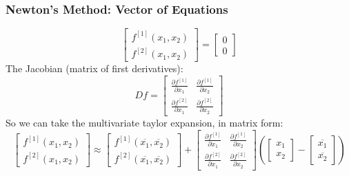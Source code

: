 \documentclass{beamer}
\begin{document}
\begin{frame}
\frametitle[alignment=center]{Newton's Method: Vector of Equations}
$$\left[\begin{array}{c}f^{[1]}(x_1,x_2) \\ f^{[2]}(x_1,x_2)\end{array}\right]=\left[\begin{array}{c}0 \\ 0\end{array}\right]$$
The Jacobian (matrix of first derivatives):
$$Df = \left[\begin{array}{cc}\frac{\partial f^{[1]}}{\partial x_1} & \frac{\partial f^{[1]}}{\partial x_2} \\\frac{\partial f^{[2]}}{\partial x_1} & \frac{\partial f^{[2]}}{\partial x_2}\end{array}\right]$$
So we can take the multivariate taylor expansion, in matrix form:
$$\left[\begin{array}{c}f^{[1]}(x_1,x_2) \\ f^{[2]}(x_1,x_2)\end{array}\right]\approx \left[\begin{array}{c}f^{[1]}(\overline{x_1},\overline{x_2}) \\ f^{[2]}(\overline{x_1},\overline{x_2})\end{array}\right]+ \left[\begin{array}{cc}\frac{\partial f^{[1]}}{\partial x_1} & \frac{\partial f^{[1]}}{\partial x_2} \\\frac{\partial f^{[2]}}{\partial x_1} & \frac{\partial f^{[2]}}{\partial x_2}\end{array}\right]\left(\left[\begin{array}{c}x_1 \\ x_2\end{array}\right]-\left[\begin{array}{c}\overline{x_1} \\ \overline{x_2}\end{array}\right]\right)$$
\end{frame}
\end{document}
